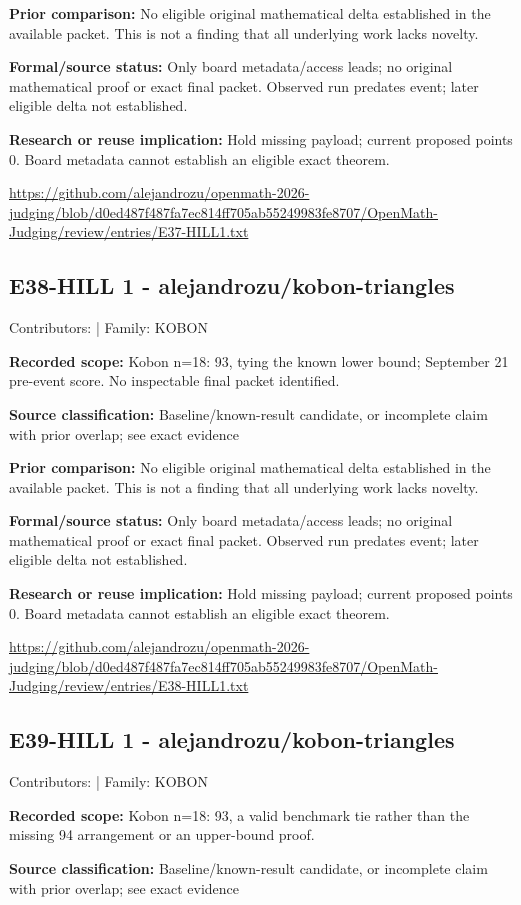 \documentclass[11pt,a4paper]{article}
\begin{document}
\textbf{Prior comparison:} No eligible original mathematical delta established in the available packet. This is not a finding that all underlying work lacks novelty.

\textbf{Formal/source status:} Only board metadata/access leads; no original mathematical proof or exact final packet. Observed run predates event; later eligible delta not established.

\textbf{Research or reuse implication:} Hold missing payload; current proposed points 0. Board metadata cannot establish an eligible exact theorem.

{\small \url{https://github.com/alejandrozu/openmath-2026-judging/blob/d0ed487f487fa7ec814ff705ab55249983fe8707/OpenMath-Judging/review/entries/E37-HILL1.txt}\par}

\begin{samepage}
\subsection{E38-HILL 1  -  alejandrozu/kobon-triangles}
{\small Contributors:  | Family: KOBON\par}

\textbf{Recorded scope:} Kobon n=18: 93, tying the known lower bound; September 21 pre-event score. No inspectable final packet identified.

\end{samepage}
\textbf{Source classification:} Baseline/known-result candidate, or incomplete claim with prior overlap; see exact evidence

\textbf{Prior comparison:} No eligible original mathematical delta established in the available packet. This is not a finding that all underlying work lacks novelty.

\textbf{Formal/source status:} Only board metadata/access leads; no original mathematical proof or exact final packet. Observed run predates event; later eligible delta not established.

\textbf{Research or reuse implication:} Hold missing payload; current proposed points 0. Board metadata cannot establish an eligible exact theorem.

{\small \url{https://github.com/alejandrozu/openmath-2026-judging/blob/d0ed487f487fa7ec814ff705ab55249983fe8707/OpenMath-Judging/review/entries/E38-HILL1.txt}\par}

\begin{samepage}
\subsection{E39-HILL 1  -  alejandrozu/kobon-triangles}
{\small Contributors:  | Family: KOBON\par}

\textbf{Recorded scope:} Kobon n=18: 93, a valid benchmark tie rather than the missing 94 arrangement or an upper-bound proof.

\end{samepage}
\textbf{Source classification:} Baseline/known-result candidate, or incomplete claim with prior overlap; see exact evidence
\end{document}
